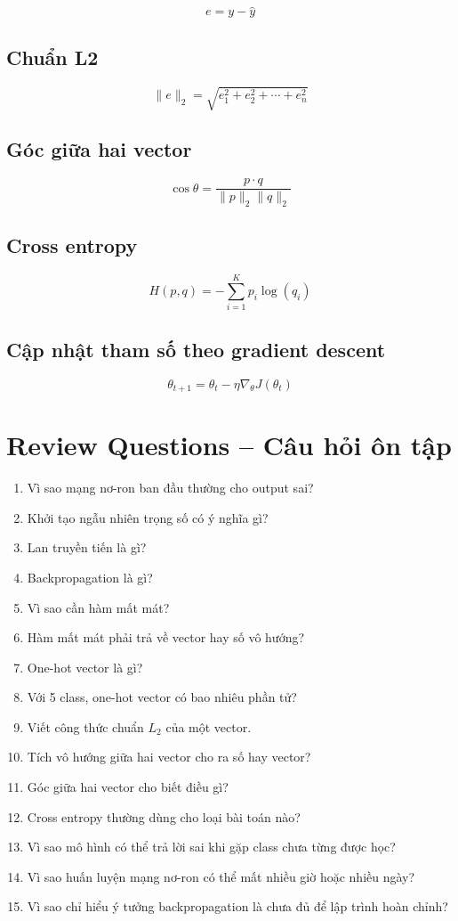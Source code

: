 \[
    e = y-\hat{y}
\]

\subsection*{Chuẩn L2}

\[
    \|e\|_2 = \sqrt{e_1^2+e_2^2+\cdots+e_n^2}
\]

\subsection*{Góc giữa hai vector}

\[
    \cos\theta =
    \frac{p\cdot q}{\|p\|_2\|q\|_2}
\]

\subsection*{Cross entropy}

\[
    H(p,q)=-\sum_{i=1}^{K}p_i\log(q_i)
\]

\subsection*{Cập nhật tham số theo gradient descent}

\[
    \theta_{t+1}=\theta_t-\eta\nabla_{\theta}J(\theta_t)
\]

\section{Review Questions -- Câu hỏi ôn tập}

\begin{enumerate}
    \item Vì sao mạng nơ-ron ban đầu thường cho output sai?
    \item Khởi tạo ngẫu nhiên trọng số có ý nghĩa gì?
    \item Lan truyền tiến là gì?
    \item Backpropagation là gì?
    \item Vì sao cần hàm mất mát?
    \item Hàm mất mát phải trả về vector hay số vô hướng?
    \item One-hot vector là gì?
    \item Với 5 class, one-hot vector có bao nhiêu phần tử?
    \item Viết công thức chuẩn $L_2$ của một vector.
    \item Tích vô hướng giữa hai vector cho ra số hay vector?
    \item Góc giữa hai vector cho biết điều gì?
    \item Cross entropy thường dùng cho loại bài toán nào?
    \item Vì sao mô hình có thể trả lời sai khi gặp class chưa từng được học?
    \item Vì sao huấn luyện mạng nơ-ron có thể mất nhiều giờ hoặc nhiều ngày?
    \item Vì sao chỉ hiểu ý tưởng backpropagation là chưa đủ để lập trình hoàn chỉnh?
\end{enumerate}

